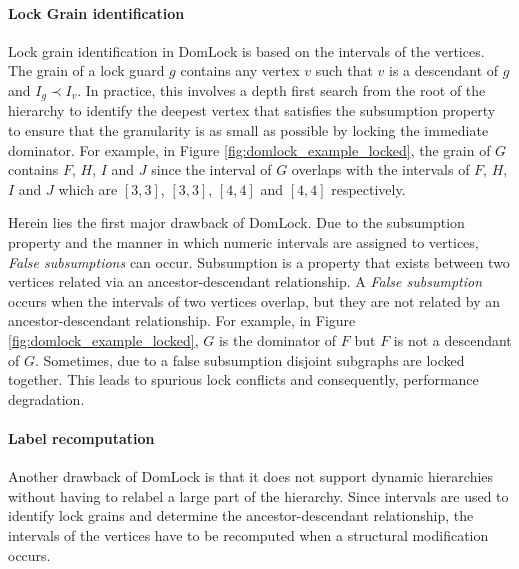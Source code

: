 \paragraph{Lock Grain identification}

Lock grain identification in DomLock is based on the intervals of the vertices. The grain of a lock guard $g$ contains any vertex $v$ such that $v$ is a descendant of $g$ and $I_g \prec I_v$. 
In practice, this involves a depth first search from the root of the hierarchy to identify the deepest vertex that satisfies the subsumption property to ensure that the granularity is as small as possible by locking the immediate dominator.
For example, in Figure \ref{fig:domlock_example_locked}, the grain of $G$ contains $F$, $H$, $I$ and $J$ since the interval of $G$ overlaps with the intervals of $F$, $H$, $I$ and $J$ which are $[3,3]$, $[3,3]$, $[4,4]$ and $[4,4]$ respectively.

Herein lies the first major drawback of DomLock. 
Due to the subsumption property and the manner in which numeric intervals are assigned to vertices, \emph{False subsumptions} can occur. 
Subsumption is a property that exists between two vertices related via an ancestor-descendant relationship. 
A \emph{False subsumption} occurs when the intervals of two vertices overlap, but they are not related by an ancestor-descendant relationship. 
For example, in Figure \ref{fig:domlock_example_locked}, $G$ is the dominator of $F$ but $F$ is not a descendant of $G$. 
Sometimes, due to a false subsumption disjoint subgraphs are locked together. 
This leads to spurious lock conflicts and consequently, performance degradation. 

\paragraph{Label recomputation}
Another drawback of DomLock is that it does not support dynamic hierarchies without having to relabel a large part of the hierarchy.
Since intervals are used to identify lock grains and determine the ancestor-descendant relationship, the intervals of the vertices have to be recomputed when a structural modification occurs.

